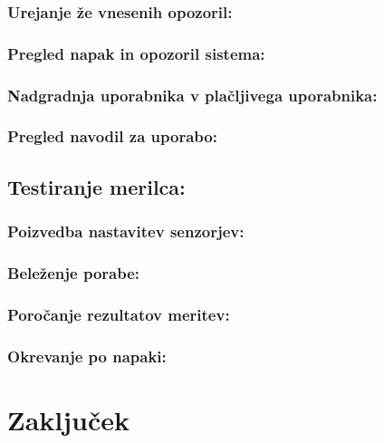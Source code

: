 \documentclass[12pt,a4paper,titlepage,openany]{report}
\begin{document}
\subsection{Urejanje že vnesenih opozoril:}
\subsection{Pregled napak in opozoril sistema:}
\subsection{Nadgradnja uporabnika v plačljivega uporabnika:}
\subsection{Pregled navodil za uporabo:}

\section{Testiranje merilca:}
\thispagestyle{fancy}


\subsection{Poizvedba nastavitev senzorjev:}
\subsection{Beleženje porabe:}
\subsection{Poročanje rezultatov meritev:}
\subsection{Okrevanje po napaki:}


\chapter{Zaključek}
\thispagestyle{fancy}







\end{document}
